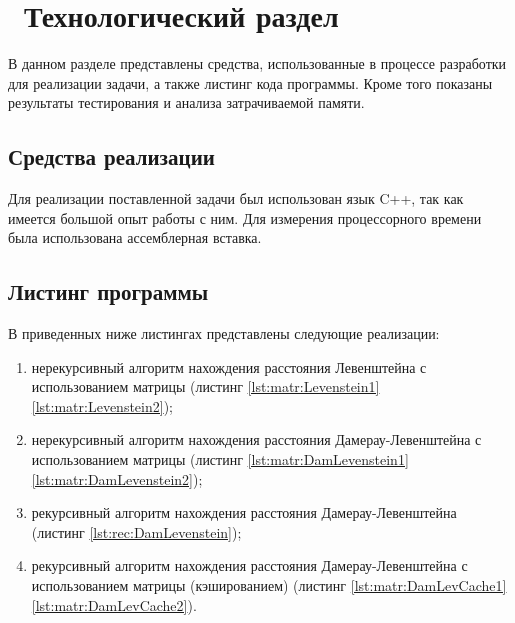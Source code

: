 \chapter{ Технологический раздел}
\label{cha:technological}

    В данном разделе представлены средства, использованные в процессе разработки для реализации задачи, а также листинг кода программы. Кроме того показаны результаты тестирования и анализа затрачиваемой памяти.

    \section{Средства реализации}
        Для реализации поставленной задачи был использован язык C++, так как имеется большой опыт работы с ним. Для измерения процессорного времени была использована ассемблерная вставка. 


    \section{Листинг программы}
        В приведенных ниже листингах представлены следующие реализации: 
        \begin{enumerate}
            \item нерекурсивный алгоритм нахождения расстояния Левенштейна с использованием матрицы (листинг \ref{lst:matr:Levenstein1} \ref{lst:matr:Levenstein2});
            \item нерекурсивный алгоритм нахождения расстояния Дамерау-Левенштейна с использованием матрицы (листинг \ref{lst:matr:DamLevenstein1} \ref{lst:matr:DamLevenstein2});
            \item рекурсивный алгоритм нахождения расстояния Дамерау-Левенштейна (листинг \ref{lst:rec:DamLevenstein});
            \item рекурсивный алгоритм нахождения расстояния Дамерау-Левенштейна с использованием матрицы (кэшированием) (листинг \ref{lst:matr:DamLevCache1} \ref{lst:matr:DamLevCache2}).
        \end{enumerate}
        
       

